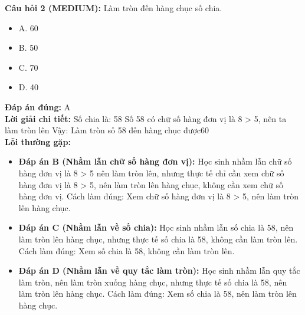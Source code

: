 \documentclass{article}
\begin{document}
\begin{minipage}{\textwidth}
\noindent\textbf{Câu hỏi 2 (MEDIUM):} Làm tròn đến hàng chục số chia. 
\begin{itemize}[label={}]
    \item A. 60
    \item B. 50
    \item C. 70
    \item D. 40
\end{itemize}
\textbf{Đáp án đúng:} A \\
\textbf{Lời giải chi tiết:} Số chia là: 58 Số 58 có chữ số hàng đơn vị là 8 > 5, nên ta làm tròn lên Vậy: Làm tròn số 58 đến hàng chục được60 \\
\textbf{Lỗi thường gặp:}
\begin{itemize}
  \item \textbf{Đáp án B (Nhầm lẫn chữ số hàng đơn vị):} Học sinh nhầm lẫn chữ số hàng đơn vị là 8 > 5 nên làm tròn lên, nhưng thực tế chỉ cần xem chữ số hàng đơn vị là 8 > 5, nên làm tròn lên hàng chục, không cần xem chữ số hàng đơn vị. Cách làm đúng: Xem chữ số hàng đơn vị là 8 > 5, nên làm tròn lên hàng chục.
  \item \textbf{Đáp án C (Nhầm lẫn về số chia):} Học sinh nhầm lẫn số chia là 58, nên làm tròn lên hàng chục, nhưng thực tế số chia là 58, không cần làm tròn lên. Cách làm đúng: Xem số chia là 58, không cần làm tròn lên.
  \item \textbf{Đáp án D (Nhầm lẫn về quy tắc làm tròn):} Học sinh nhầm lẫn quy tắc làm tròn, nên làm tròn xuống hàng chục, nhưng thực tế số chia là 58, nên làm tròn lên hàng chục. Cách làm đúng: Xem số chia là 58, nên làm tròn lên hàng chục.
\end{itemize}
\end{minipage}
\vspace{1em}
\end{document}
